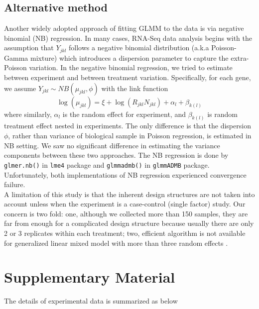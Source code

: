 \documentclass[11pt, a4paper]{article}
\begin{document}
  \subsection{Alternative method}
Another widely adopted approach of fitting GLMM to the data is via negative binomial (NB) regression. In many cases,  RNA-Seq data analysis begins with the assumption that $Y_{jkl}$ follows a negative binomial distribution (a.k.a Poisson-Gamma mixture) which introduces a dispersion parameter to capture the extra-Poisson variation.  In the negative binomial regression, we tried to estimate between experiment and between treatment variation. Specifically,  for each gene, we assume $Y_{jkl}\sim NB(\mu_{jkl}, \phi)$ with the link function
 \[\log(\mu_{jkl})= \xi + \log(R_{jkl}N_{jkl}) + \alpha_l + \beta_{k(l)}\]
where similarly, $\alpha_l$ is the random effect for experiment, and $\beta_{k(l)}$ is random treatment effect nested in experiments.  The only difference is that the dispersion $\phi$, rather than variance of biological sample in Poisson regression, is estimated in NB setting. We saw no significant difference in estimating the variance components between these two approaches. The NB regression is done by \verb"glmer.nb()" in \verb"lme4" package\citep{bates2012lme4} and \verb"glmmadmb()" in \verb"glmmADMB" package\citep{bolker2012getting}. Unfortunately, both implementations of NB regression experienced convergence failure. \\

A limitation of this study is that the inherent design structures are not taken into account unless when the experiment is a case-control (single factor) study. Our concern is two fold: one, although we collected more than 150 samples, they are far from enough for a complicated design structure because usually there are only 2 or 3 replicates within each treatment;  two, efficient algorithm is not available for generalized linear mixed model with more than three random effects \citep{bolker2009generalized}. 

\section{Supplementary Material}
The details of experimental data is summarized as below
\end{document}
